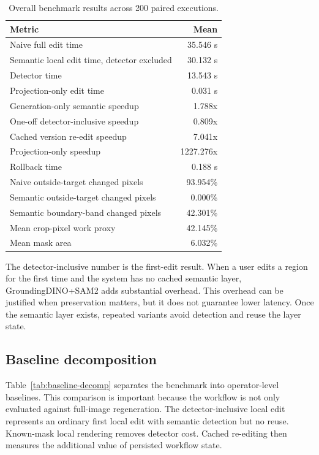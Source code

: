 \documentclass[final,5p,times,number,sort&compress]{elsarticle}
\begin{document}
\begin{table}[t]
\centering
\caption{Overall benchmark results across 200 paired executions.}
\label{tab:overall}
\begin{tabular}{lr}
\toprule
Metric & Mean \\
\midrule
Naive full edit time & 35.546 s \\
Semantic local edit time, detector excluded & 30.132 s \\
Detector time & 13.543 s \\
Projection-only edit time & 0.031 s \\
Generation-only semantic speedup & 1.788x \\
One-off detector-inclusive speedup & 0.809x \\
Cached version re-edit speedup & 7.041x \\
Projection-only speedup & 1227.276x \\
Rollback time & 0.188 s \\
Naive outside-target changed pixels & 93.954\% \\
Semantic outside-target changed pixels & 0.000\% \\
Semantic boundary-band changed pixels & 42.301\% \\
Mean crop-pixel work proxy & 42.145\% \\
Mean mask area & 6.032\% \\
\bottomrule
\end{tabular}
\end{table}

The detector-inclusive number is the first-edit result. When a user edits a region for the first time and the system has no cached semantic layer, GroundingDINO+SAM2 adds substantial overhead. This overhead can be justified when preservation matters, but it does not guarantee lower latency. Once the semantic layer exists, repeated variants avoid detection and reuse the layer state.

\subsection{Baseline decomposition}

Table~\ref{tab:baseline-decomp} separates the benchmark into operator-level baselines. This comparison is important because the workflow is not only evaluated against full-image regeneration. The detector-inclusive local edit represents an ordinary first local edit with semantic detection but no reuse. Known-mask local rendering removes detector cost. Cached re-editing then measures the additional value of persisted workflow state.
\end{document}
